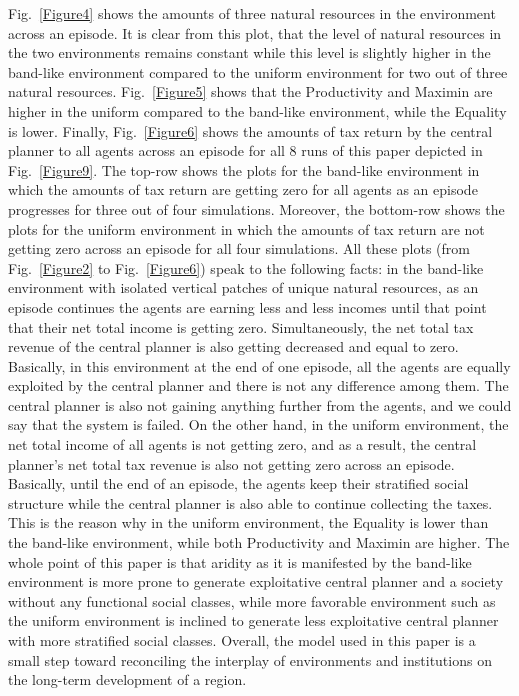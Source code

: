 \documentclass{article}
\begin{document}
Fig.~\ref{Figure4} shows the amounts of three natural resources in the environment across an episode. It is clear from this plot, that the level of natural resources in the two environments remains constant while this level is slightly higher in the band-like environment compared to the uniform environment for two out of three natural resources. Fig.~\ref{Figure5} shows that the Productivity and Maximin are higher in the uniform compared to the band-like environment, while the Equality is lower. Finally, Fig.~\ref{Figure6} shows the amounts of tax return by the central planner to all agents across an episode for all 8 runs of this paper depicted in Fig.~\ref{Figure9}. The top-row shows the plots for the band-like environment in which the amounts of tax return are getting zero for all agents as an episode progresses for three out of four simulations. Moreover, the bottom-row shows the plots for the uniform environment in which the amounts of tax return are not getting zero across an episode for all four simulations. All these plots (from Fig.~\ref{Figure2} to Fig.~\ref{Figure6}) speak to the following facts: in the band-like environment with isolated vertical patches of unique natural resources, as an episode continues the agents are earning less and less incomes until that point that their net total income is getting zero. Simultaneously, the net total tax revenue of the central planner is also getting decreased and equal to zero. Basically, in this environment at the end of one episode, all the agents are equally exploited by the central planner and there is not any difference among them. The central planner is also not gaining anything further from the agents, and we could say that the system is failed. On the other hand, in the uniform environment, the net total income of all agents is not getting zero, and as a result, the central planner's net total tax revenue is also not getting zero across an episode. Basically, until the end of an episode, the agents keep their stratified social structure while the central planner is also able to continue collecting the taxes. This is the reason why in the uniform environment, the Equality is lower than the band-like environment, while both Productivity and Maximin are higher. The whole point of this paper is that aridity as it is manifested by the band-like environment is more prone to generate exploitative central planner and a society without any functional social classes, while more favorable environment such as the uniform environment is inclined to generate less exploitative central planner with more stratified social classes. Overall, the model used in this paper is a small step toward reconciling the interplay of environments and institutions on the long-term development of a region.          
\end{document}
